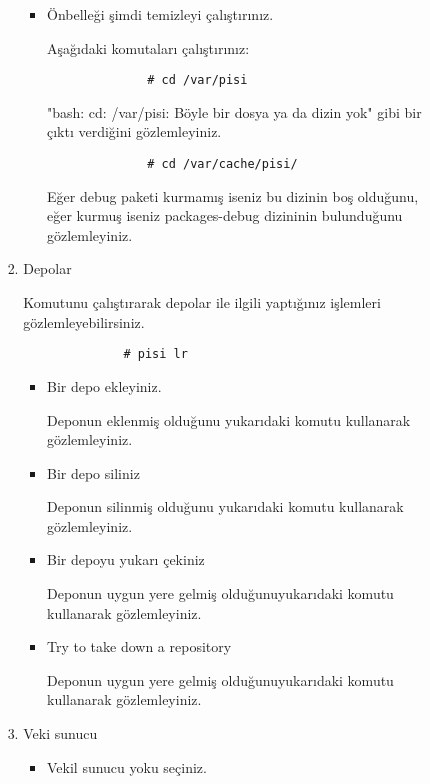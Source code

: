 \documentclass[a4paper,10pt]{article}
\begin{document}
\begin{enumerate}
\begin{enumerate}
\begin{enumerate}
\begin{enumerate}
\begin{itemize}
		      \item Önbelleği şimdi temizleyi çalıştırınız.

		      Aşağıdaki komutaları çalıştırınız: 
		      \begin{verbatim}
		      # cd /var/pisi
		      \end{verbatim}

		      "bash: cd: /var/pisi: Böyle bir dosya ya da dizin yok" gibi bir çıktı verdiğini gözlemleyiniz.
	    
		      \begin{verbatim}
		      # cd /var/cache/pisi/
		      \end{verbatim}
		
		      Eğer debug paketi kurmamış iseniz bu dizinin boş olduğunu, eğer kurmuş iseniz packages-debug dizininin bulunduğunu gözlemleyiniz.
		   
                \end{itemize} 
                \item Depolar

		 Komutunu çalıştırarak depolar ile ilgili yaptığınız işlemleri gözlemleyebilirsiniz.
		    \begin{verbatim}
		      # pisi lr
		    \end{verbatim}
                \begin{itemize}
                    \item Bir depo ekleyiniz.
		    
		    Deponun eklenmiş olduğunu yukarıdaki komutu kullanarak gözlemleyiniz.

                    \item Bir depo siliniz
		
		    Deponun silinmiş olduğunu yukarıdaki komutu kullanarak gözlemleyiniz.
                    \item Bir depoyu yukarı çekiniz
 
		     Deponun uygun yere gelmiş olduğunuyukarıdaki komutu kullanarak gözlemleyiniz.
                    \item Try to take down a repository 

                    Deponun uygun yere gelmiş olduğunuyukarıdaki komutu kullanarak gözlemleyiniz.
                \end{itemize}
                \item Veki sunucu
                \begin{itemize}
                    \item  Vekil sunucu yoku seçiniz.


\end{itemize}
\end{enumerate}
\end{enumerate}
\end{enumerate}
\end{enumerate}
\end{document}
